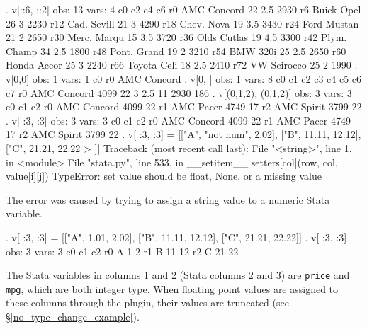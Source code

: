 \documentclass{article}
\begin{document}
\begin{stlog}
. v[::6, ::2]
{\smallskip}
  obs: 13
 vars:  4
{\smallskip}
             c0        c2        c4        c6
 r0 AMC Concord        22       2.5      2930
 r6  Buick Opel        26         3      2230
r12 Cad. Sevill        21         3      4290
r18  Chev. Nova        19       3.5      3430
r24 Ford Mustan        21         2      2650
r30 Merc. Marqu        15       3.5      3720
r36 Olds Cutlas        19       4.5      3300
r42 Plym. Champ        34       2.5      1800
r48 Pont. Grand        19         2      3210
r54    BMW 320i        25       2.5      2650
r60 Honda Accor        25         3      2240
r66 Toyota Celi        18       2.5      2410
r72 VW Scirocco        25         2      1990
{\smallskip}
. v[0,0]
{\smallskip}
  obs: 1
 vars: 1
{\smallskip}
            c0
r0 AMC Concord
{\smallskip}
. v[0, ]
{\smallskip}
  obs: 1
 vars: 8
{\smallskip}
            c0       c1       c2       c3       c4       c5       c6       c7
r0 AMC Concord     4099       22        3      2.5       11     2930      186
{\smallskip}
. v[(0,1,2), (0,1,2)]
{\smallskip}
  obs: 3
 vars: 3
{\smallskip}
            c0        c1        c2
r0 AMC Concord      4099        22
r1   AMC Pacer      4749        17
r2  AMC Spirit      3799        22
{\smallskip}
. v[ :3, :3]
{\smallskip}
  obs: 3
 vars: 3
{\smallskip}
            c0        c1        c2
r0 AMC Concord      4099        22
r1   AMC Pacer      4749        17
r2  AMC Spirit      3799        22
{\smallskip}
. v[ :3, :3] = [["A", "not num", 2.02], ["B", 11.11, 12.12], ["C", 21.21, 22.22
> ]]
{\color{red}Traceback (most recent call last):
  File "<string>", line 1, in <module>
  File "stata.py", line 533, in __setitem__
    setters[col](row, col, value[i][j])
TypeError: set value should be float, None, or a missing value}
\end{stlog}

\medskip

The error was caused by trying to assign a string value to a numeric Stata variable.

\begin{stlog}
. v[ :3, :3] = [["A", 1.01, 2.02], ["B", 11.11, 12.12], ["C", 21.21, 22.22]]
{\smallskip}
. v[ :3, :3]
{\smallskip}
  obs: 3
 vars: 3
{\smallskip}
            c0        c1        c2
r0           A         1         2
r1           B        11        12
r2           C        21        22
\end{stlog}

\medskip

The Stata variables in columns 1 and 2 (Stata columns 2 and 3) are \lstinline{price} and \lstinline{mpg}, which are both integer type. When floating point values are assigned to these columns through the plugin, their values are truncated (see \S\ref{no_type_change_example}).
\end{document}
